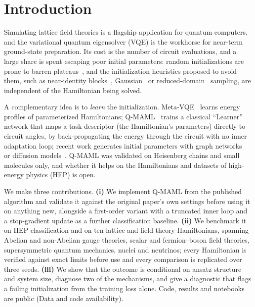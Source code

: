 \section{Introduction}\label{sec:intro}

Simulating lattice field theories is a flagship application for quantum computers, and the variational quantum eigensolver (VQE) is the workhorse for near-term ground-state preparation. Its cost is the number of circuit evaluations, and a large share is spent escaping poor initial parameters: random initializations are prone to barren plateaus~\cite{mcclean2018barren,cerezo2021costfunction}, and the initialization heuristics proposed to avoid them, such as near-identity blocks~\cite{grant2019initialization}, Gaussian~\cite{zhang2022escaping} or reduced-domain~\cite{wang2023trainability} sampling, are independent of the Hamiltonian being solved.

A complementary idea is to \emph{learn} the initialization. Meta-VQE~\cite{cerveralierta2021metavqe} learns energy profiles of parameterized Hamiltonians; Q-MAML~\cite{leeqmaml2025} trains a classical ``Learner'' network that maps a task descriptor (the Hamiltonian's parameters) directly to circuit angles, by back-propagating the energy through the circuit with no inner adaptation loop; recent work generates initial parameters with graph networks~\cite{qracle2025} or diffusion models~\cite{diffq2025}. Q-MAML was validated on Heisenberg chains and small molecules only, and whether it helps on the Hamiltonians and datasets of high-energy physics (HEP) is open.

We make three contributions. \textbf{(i)} We implement Q-MAML from the published algorithm and validate it against the original paper's own settings before using it on anything new, alongside a first-order variant with a truncated inner loop and a stop-gradient update as a further classification baseline. \textbf{(ii)} We benchmark it on HEP classification and on ten lattice and field-theory Hamiltonians, spanning Abelian and non-Abelian gauge theories, scalar and fermion--boson field theories, supersymmetric quantum mechanics, nuclei and neutrinos; every Hamiltonian is verified against exact limits before use and every comparison is replicated over three seeds. \textbf{(iii)} We show that the outcome is conditional on ansatz structure and system size, diagnose two of the mechanisms, and give a diagnostic that flags a failing initialization from the training loss alone. Code, results and notebooks are public (Data and code availability).

